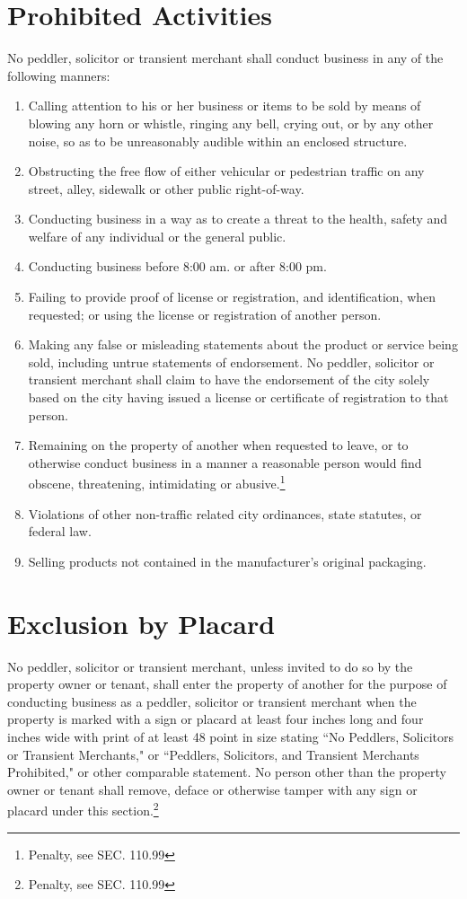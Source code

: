 \section{Prohibited Activities}
No peddler, solicitor or transient merchant shall conduct business in any of the following manners:
\begin{enumerate}[{\indent}A)]
    \item Calling attention to his or her business or items to be sold by means of blowing any horn or whistle, ringing any bell, crying out, or by any other noise, so as to be unreasonably audible within an enclosed structure.
    \item Obstructing the free flow of either vehicular or pedestrian traffic on any street, alley, sidewalk or other public right-of-way.
    \item Conducting business in a way as to create a threat to the health, safety and welfare of any individual or the general public.
    \item Conducting business before 8:00 am. or after 8:00 pm.
    \item Failing to provide proof of license or registration, and identification, when requested; or using the license or registration of another person.
    \item Making any false or misleading statements about the product or service being sold, including untrue statements of endorsement. No peddler, solicitor or transient merchant shall claim to have the endorsement of the city solely based on the city having issued a license or certificate of registration to that person.
    \item Remaining on the property of another when requested to leave, or to otherwise conduct business in a manner a reasonable person would find obscene, threatening, intimidating or abusive.\footnote{Penalty, see SEC. 110.99}
    \item Violations of other non-traffic related city ordinances, state statutes, or federal law.
    \item Selling products not contained in the manufacturer's original packaging.
\end{enumerate}

\section{Exclusion by Placard}
No peddler, solicitor or transient merchant, unless invited to do so by the property owner or tenant, shall enter the property of another for the purpose of conducting business as a peddler, solicitor or transient merchant when the property is marked with a sign or placard at least four inches long and four inches wide with print of at least 48 point in size stating “No Peddlers, Solicitors or Transient Merchants," or “Peddlers, Solicitors, and Transient Merchants Prohibited," or other comparable statement. No person other than the property owner or tenant shall remove, deface or otherwise tamper with any sign or placard under this section.\footnote{Penalty, see SEC. 110.99}

